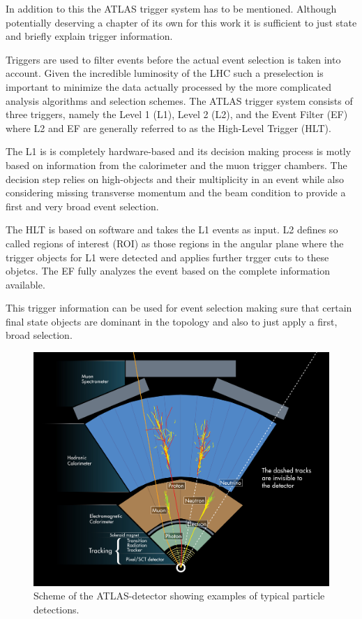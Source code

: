 In addition to this the ATLAS trigger system has to be mentioned. Although potentially deserving a chapter of its own for this work it is sufficient to just state  and briefly explain trigger information.

Triggers are used to filter events before the actual event selection is taken into account. Given the incredible luminosity of the LHC such a preselection is important to minimize the data actually processed by the more complicated analysis algorithms and selection schemes.
The ATLAS trigger system consists of three triggers, namely the Level 1 (L1), Level 2 (L2), and the Event Filter (EF) where L2 and EF are generally referred to as the High-Level Trigger (HLT).

The L1 is is completely hardware-based and its decision making process is motly based on information from the calorimeter and the muon trigger chambers. The decision step relies on high-\pT objects and their multiplicity in an event while also considering missing transverse momentum and the beam condition to provide a first and very broad event selection.

The HLT is based on software and takes the L1 events as input. L2 defines so called regions of interest (ROI) as those regions in the angular plane where the trigger objects for L1 were detected and applies further trgger cuts to these objetcs.
The EF fully analyzes the event based on the complete information available.

This trigger information can be used for event selection making sure that certain final state objects are dominant in the topology and also to just apply a first, broad selection.



\begin{figure}[htbp]
  \centering
  \includegraphics[scale=0.6]{figures_LHC/atlas-abstract}
  \caption[Scheme of the ATLAS-detector's detection procedure]{Scheme of the ATLAS-detector showing examples of typical particle detections. \cite{Pequenao:1095924}}
  \label{fig:atlas_sketch}
\end{figure}


